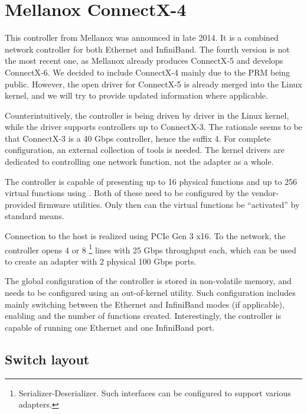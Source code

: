 \section{Mellanox ConnectX-4}

This controller from Mellanox was announced in late 2014. It is a combined
network controller for both Ethernet and InfiniBand. The fourth version is not
the most recent one, as Mellanox already produces ConnectX-5 and develops
ConnectX-6. We decided to include ConnectX-4 mainly due to the
\acrfull{PRM} \cite{mlx-prm} being public. However, the open driver for
ConnectX-5 is already merged into the Linux kernel, and we will try to provide
updated information where applicable.

Counterintuitively, the controller is being driven by  driver in the
Linux kernel, while the  driver supports controllers up to ConnectX-3.
The rationale seems to be that ConnectX-3 is a 40 Gbps controller, hence the
suffix 4. For complete configuration, an external collection of tools is needed.
The kernel drivers are dedicated to controlling one network function, not the
adapter as a whole.

The controller is capable of presenting up to 16 physical functions and up to
256 virtual functions using . Both of these need to be configured by
the vendor-provided firmware utilities. Only then can the virtual functions be
``activated'' by standard means.

Connection to the host is realized using PCIe Gen 3 x16. To the network, the
controller opens 4 or 8 \footnote{Serializer-Deserializer. Such
interfaces can be configured to support various  adapters.} lines with
25 Gbps throughput each, which
can be used to create an adapter with 2 physical 100 Gbps ports.

The global configuration of the controller is stored in non-volatile memory, and
needs to be configured using an out-of-kernel utility. Such configuration
includes mainly switching between the Ethernet and InfiniBand modes (if
applicable), enabling  and the number of functions created.
Interestingly, the controller is capable of running one Ethernet and one
InfiniBand port.

\subsection{Switch layout}

